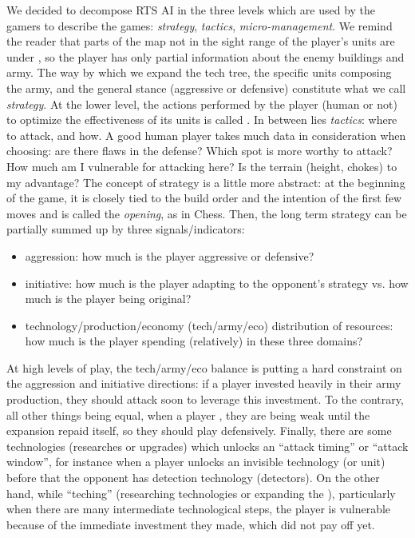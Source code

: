 We decided to decompose RTS AI in the three levels which are used by the gamers to describe the games: \textit{strategy}, \textit{tactics}, \textit{micro-management}. We remind the reader that parts of the map not in the sight range of the player's units are under \textit{}, so the player has only partial information about the enemy buildings and army. The way by which we expand the tech tree, the specific units composing the army, and the general stance (aggressive or defensive) constitute what we call \textit{strategy}. At the lower level, the actions performed by the player (human or not) to optimize the effectiveness of its units is called \textit{}. In between lies \textit{tactics}: where to attack, and how. A good human player takes much data in consideration when choosing: are there flaws in the defense? Which spot is more worthy to attack? How much am I vulnerable for attacking here? Is the terrain (height, chokes) to my advantage? The concept of strategy is a little more abstract: at the beginning of the game, it is closely tied to the build order and the intention of the first few moves and is called the \textit{opening}, as in Chess. Then, the long term strategy can be partially summed up by three signals/indicators:
\begin{itemize}
    \item aggression: how much is the player aggressive or defensive?
    \item initiative: how much is the player adapting to the opponent's strategy vs. how much is the player being original?
    \item technology/production/economy (tech/army/eco) distribution of resources: how much is the player spending (relatively) in these three domains?
\end{itemize}
At high levels of play, the tech/army/eco balance is putting a hard constraint on the aggression and initiative directions: if a player invested heavily in their army production, they should attack soon to leverage this investment. To the contrary, all other things being equal, when a player , they are being weak until the expansion repaid itself, so they should play defensively. Finally, there are some technologies (researches or upgrades) which unlocks an ``attack timing'' or ``attack window'', for instance when a player unlocks an invisible technology (or unit) before that the opponent has detection technology (detectors). On the other hand, while ``teching'' (researching technologies or expanding the ), particularly when there are many intermediate technological steps, the player is vulnerable because of the immediate investment they made, which did not pay off yet.

